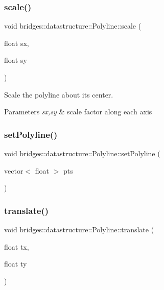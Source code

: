 \subsubsection{\texorpdfstring{scale()}{scale()}}
{\footnotesize\ttfamily void bridges\+::datastructure\+::\+Polyline\+::scale (\begin{DoxyParamCaption}\item[{float}]{sx,  }\item[{float}]{sy }\end{DoxyParamCaption})\hspace{0.3cm}{\ttfamily [inline]}}



Scale the polyline about its center. 


\begin{DoxyParams}{Parameters}
{\em sx,sy} & scale factor along each axis \\
\hline
\end{DoxyParams}
\mbox{\label{classbridges_1_1datastructure_1_1_polyline_ab1fb850dabd3ed58fd4f916992a0b9a6}} 
\subsubsection{\texorpdfstring{setPolyline()}{setPolyline()}}
{\footnotesize\ttfamily void bridges\+::datastructure\+::\+Polyline\+::set\+Polyline (\begin{DoxyParamCaption}\item[{vector$<$ float $>$}]{pts }\end{DoxyParamCaption})\hspace{0.3cm}{\ttfamily [inline]}}

\mbox{\label{classbridges_1_1datastructure_1_1_polyline_a0b651b1c383b228f8d473232e64e4bda}} 
\subsubsection{\texorpdfstring{translate()}{translate()}}
{\footnotesize\ttfamily void bridges\+::datastructure\+::\+Polyline\+::translate (\begin{DoxyParamCaption}\item[{float}]{tx,  }\item[{float}]{ty }\end{DoxyParamCaption})\hspace{0.3cm}{\ttfamily [inline]}}



